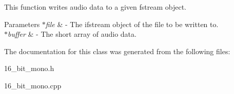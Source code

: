 This function writes audio data to a given fstream object. 
\begin{DoxyParams}{Parameters}
{\em $\ast$file} & -\/ The ifstream object of the file to be written to. \\
\hline
{\em $\ast$buffer} & -\/ The short array of audio data. \\
\hline
\end{DoxyParams}


The documentation for this class was generated from the following files\+:\begin{DoxyCompactItemize}
\item 
16\+\_\+bit\+\_\+mono.\+h\item 
16\+\_\+bit\+\_\+mono.\+cpp\end{DoxyCompactItemize}

